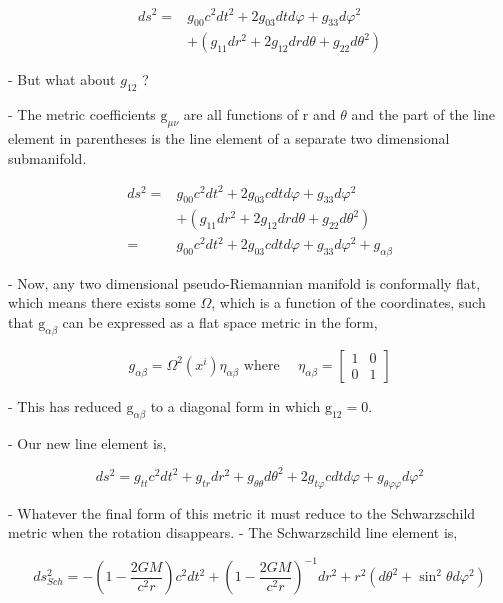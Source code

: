 \begin{align}
    d s^2= & g_{00} c^2 d t^2+2 g_{03} d t d \varphi+g_{33} d \varphi^2         \\
           & +\left(g_{11} d r^2+2 g_{12} d r d \theta+g_{22} d \theta^2\right)
\end{align}


- But what about $g_{12}$ ?

- The metric coefficients $\mathrm{g}_{\mu \nu}$ are all functions of r and $\theta$ and the part of the line element in parentheses is the line element of a separate two dimensional submanifold.


\begin{align}
    d s^2= & g_{00} c^2 d t^2+2 g_{03} c d t d \varphi+g_{33} d \varphi^2                  \\
           & +\left(g_{11} d r^2+2 g_{12} d r d \theta+g_{22} d \theta^2\right)            \\
    =      & g_{00} c^2 d t^2+2 g_{03} c d t d \varphi+g_{33} d \varphi^2+g_{\alpha \beta}
\end{align}


- Now, any two dimensional pseudo-Riemannian manifold is conformally flat, which means there exists some $\Omega$, which is a function of the coordinates, such that $\mathrm{g}_{\alpha \beta}$ can be expressed as a flat space metric in the form,

$$
    g_{\alpha \beta}=\Omega^2\left(x^i\right) \eta_{\alpha \beta} \text { where } \quad \eta_{\alpha \beta}=\left[\begin{array}{ll}
            1 & 0 \\
            0 & 1
        \end{array}\right]
$$

- This has reduced $\mathrm{g}_{\alpha \beta}$ to a diagonal form in which $\mathrm{g}_{12}=0$.


- Our new line element is,

$$
    d s^2=g_{t t} c^2 d t^2+g_{t r} d r^2+g_{\theta \theta} d \theta^2+2 g_{t \varphi} c d t d \varphi+g_{\theta \varphi \varphi} d \varphi^2
$$

- Whatever the final form of this metric it must reduce to the Schwarzschild metric when the rotation disappears.
- The Schwarzschild line element is,

$$
    d s_{S c h}^2=-\left(1-\frac{2 G M}{c^2 r}\right) c^2 d t^2+\left(1-\frac{2 G M}{c^2 r}\right)^{-1} d r^2+r^2\left(d \theta^2+\sin ^2 \theta d \varphi^2\right)
$$

